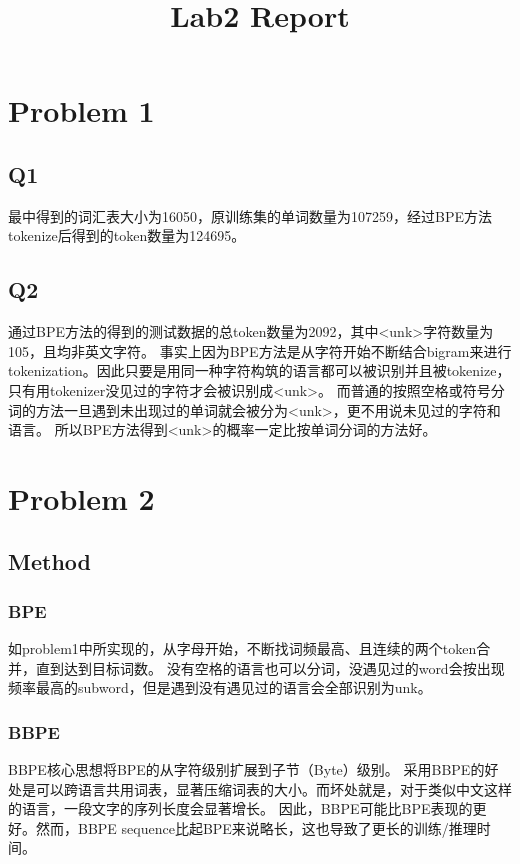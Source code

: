 \documentclass[12pt,letterpaper]{article}
\title{Lab2 Report}
\begin{document}
\maketitle

\section{Problem 1}

\subsection{Q1}

最中得到的词汇表大小为16050，原训练集的单词数量为107259，经过BPE方法tokenize后得到的token数量为124695。

\subsection{Q2}

通过BPE方法的得到的测试数据的总token数量为2092，其中<unk>字符数量为105，且均非英文字符。
事实上因为BPE方法是从字符开始不断结合bigram来进行tokenization。因此只要是用同一种字符构筑的语言都可以被识别并且被tokenize，只有用tokenizer没见过的字符才会被识别成<unk>。
而普通的按照空格或符号分词的方法一旦遇到未出现过的单词就会被分为<unk>，更不用说未见过的字符和语言。
所以BPE方法得到<unk>的概率一定比按单词分词的方法好。

\section{Problem 2}

\subsection{Method}

\subsubsection{BPE}

如problem1中所实现的，从字母开始，不断找词频最高、且连续的两个token合并，直到达到目标词数。
没有空格的语言也可以分词，没遇见过的word会按出现频率最高的subword，但是遇到没有遇见过的语言会全部识别为unk。

\subsubsection{BBPE}

BBPE核心思想将BPE的从字符级别扩展到子节（Byte）级别。
采用BBPE的好处是可以跨语言共用词表，显著压缩词表的大小。而坏处就是，对于类似中文这样的语言，一段文字的序列长度会显著增长。
因此，BBPE可能比BPE表现的更好。然而，BBPE sequence比起BPE来说略长，这也导致了更长的训练/推理时间。
\end{document}
